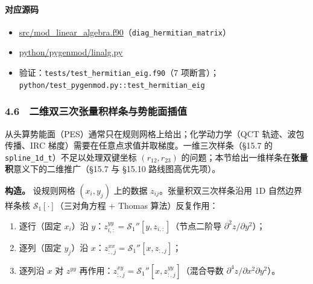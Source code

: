 \documentclass[
]{ctexbook}
\providecommand{\tightlist}{%
  \setlength{\itemsep}{0pt}\setlength{\parskip}{0pt}}
\begin{document}
\hypertarget{ux5bf9ux5e94ux6e90ux7801}{%
\paragraph{对应源码}\label{ux5bf9ux5e94ux6e90ux7801}}

\begin{itemize}
\tightlist
\item
  \href{https://github.com/l1Ha/QuantumGeneralModule/blob/main/src/mod_linear_algebra.f90}{src/mod\_linear\_algebra.f90}（\texttt{diag\_hermitian\_matrix}）
\item
  \href{https://github.com/l1Ha/QuantumGeneralModule/blob/main/python/pygenmod/linalg.py}{python/pygenmod/linalg.py}
\item
  验证：\texttt{tests/test\_hermitian\_eig.f90}（7
  项断言）；\texttt{python/test\_pygenmod.py::test\_hermitian\_eig}
\end{itemize}

\hypertarget{ux4e8cux7ef4ux53ccux4e09ux6b21ux5f20ux91cfux79efux6837ux6761ux4e0eux52bfux80fdux9762ux63d2ux503c}{%
\subsubsection{4.6　二维双三次张量积样条与势能面插值}\label{ux4e8cux7ef4ux53ccux4e09ux6b21ux5f20ux91cfux79efux6837ux6761ux4e0eux52bfux80fdux9762ux63d2ux503c}}

从头算势能面（PES）通常只在规则网格上给出；化学动力学（QCT
轨迹、波包传播、IRC 梯度）需要在任意点求值并取梯度。一维三次样条（§15.7
的 \texttt{spline\_1d\_t}）不足以处理双键坐标 \((r_{12}, r_{23})\)
的问题；本节给出一维样条在\textbf{张量积}意义下的二维推广（§15.7 与
§15.10 路线图高优先项）。

\textbf{构造。} 设规则网格 \((x_i, y_j)\) 上的数据
\(z_{ij}\)。张量积双三次样条沿用 1D 自然边界样条核
\(\mathcal{S}_1[\cdot]\)（三对角方程 + Thomas 算法）反复作用：

\begin{enumerate}
\def\labelenumi{\arabic{enumi}.}
\tightlist
\item
  逐行（固定 \(x_i\)）沿
  \(y\)：\(z^{yy}_{i,:} = \mathcal{S}_1''[y, z_{i,:}]\)（节点二阶导
  \(\partial^2z/\partial y^2\)）；
\item
  逐列（固定 \(y_j\)）沿
  \(x\)：\(z^{xx}_{:,j} = \mathcal{S}_1''[x, z_{:,j}]\)；
\item
  逐列沿 \(x\) 对 \(z^{yy}\)
  再作用：\(z^{xy}_{:,j} = \mathcal{S}_1''[x, z^{yy}_{:,j}]\)（混合导数
  \(\partial^4z/\partial x^2\partial y^2\)）。
\end{enumerate}
\end{document}

